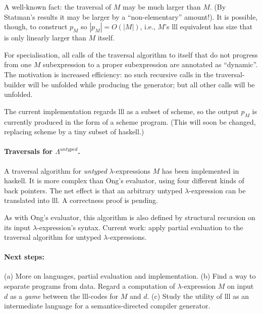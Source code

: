 \documentclass{article}
\begin{document}
A well-known fact:  the traversal of $M$ may be much larger than $M$. (By Statman's results it may be larger by a ``non-elementary'' amount!). It is possible, though, to construct $p_M$ so $|p_M| = O(|M|)$, i.e., $M$'s {\sc lll} equivalent has size that is only linearly larger than $M$
 itself.

For specialisation, all calls of the traversal algorithm to itself that do not progress from one $M$ subexpression  to a proper subexpression are annotated as ``dynamic''. 
The motivation is  increased efficiency: no such recursive calls in the traversal-builder  will  be unfolded while producing the generator;
but all other calls will be unfolded. 

The current implementation regards {\sc lll} as a subset of {\sc scheme},
so the output $p_M$ is currently produced in the form of a {\sc scheme}  program. 
(This will soon be changed, replacing {\sc scheme} by a tiny subset of {\sc haskell}.)



\paragraph{Traversals for $\Lambda^{untyped}$.}


A traversal algorithm for {\em untyped} $\lambda$-expressions $M$ has been implemented in {\sc haskell}. It is more complex than Ong's evaluator, using  four different kinds of back pointers. The net effect is that an arbitrary untyped $\lambda$-expression can be translated into {\sc lll}.
A correctness proof is pending.

 As with Ong's evaluator, this  algorithm is also defined by structural recursion on its input $\lambda$-expression's syntax.
 Current work: apply partial evaluation to the  traversal algorithm for untyped $\lambda$-expressions.


\paragraph{Next steps:} (a) More on languages, partial evaluation and implementation. (b) Find a way to separate programs from data. Regard a computation of $\lambda$-expression $M$ on input $d$ as a {\em game} between the {\sc lll}-codes for $M$ and $d$. (c) Study the utility of {\sc lll} as an intermediate language for a semantics-directed compiler generator.

\newpage









\nocite{*}
\end{document}

